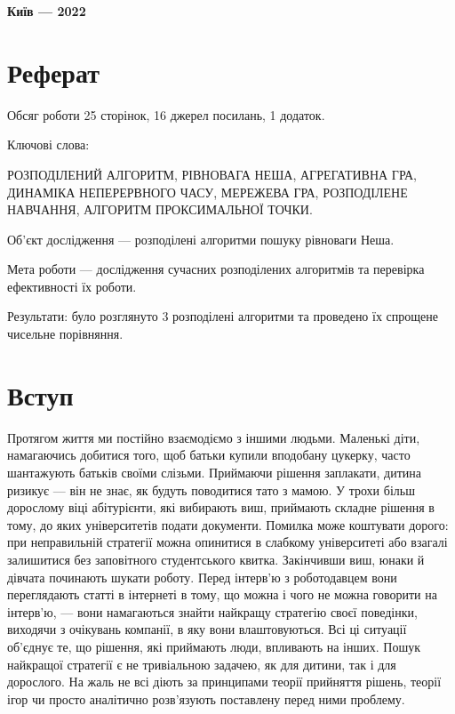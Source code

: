 \documentclass[a4paper]{article}
\begin{document}
\vfill

\centerline{\textbf{Київ --- 2022}}
\clearpage


\section*{Реферат}

Обсяг роботи 25 сторінок, 16 джерел посилань, 1 додаток.

Ключові слова:

РОЗПОДІЛЕНИЙ АЛГОРИТМ, РІВНОВАГА НЕША, АГРЕГАТИВНА ГРА, ДИНАМІКА НЕПЕРЕРВНОГО ЧАСУ, МЕРЕЖЕВА ГРА, РОЗПОДІЛЕНЕ НАВЧАННЯ, АЛГОРИТМ ПРОКСИМАЛЬНОЇ ТОЧКИ.

Об’єкт дослідження --- розподілені алгоритми пошуку рівноваги Неша.

Мета роботи --- дослідження сучасних розподілених алгоритмів та перевірка ефективності їх роботи.

Результати: було розглянуто 3
розподілені алгоритми та проведено їх спрощене чисельне порівняння.

\clearpage


\renewcommand\cftsecdotsep{\cftdot}
\cftsetpnumwidth{9pt}
\tableofcontents
\clearpage

\section{Вступ}
Протягом життя ми постійно взаємодіємо з іншими людьми. Маленькі діти, намагаючись добитися того, щоб батьки купили вподобану цукерку, часто шантажують батьків своїми слізьми. Приймаючи рішення заплакати, дитина ризикує — він не знає, як будуть поводитися тато з мамою. У трохи більш дорослому віці абітурієнти, які вибирають виш, приймають складне рішення в тому, до яких університетів подати документи. Помилка може коштувати дорого: при неправильній стратегії можна опинитися в слабкому університеті або взагалі залишитися без заповітного студентського квитка. Закінчивши виш, юнаки й дівчата починають шукати роботу. Перед інтерв'ю з роботодавцем вони переглядають статті в інтернеті в тому, що можна і чого не можна говорити на інтерв'ю, — вони намагаються знайти найкращу стратегію своєї поведінки, виходячи з очікувань компанії, в яку вони влаштовуються. Всі ці ситуації об'єднує те, що рішення, які приймають люди, впливають на інших. Пошук найкращої стратегії є не тривіальною задачею, як для дитини, так і для дорослого. На жаль не всі діють за принципами теорії прийняття рішень, теорії ігор чи просто аналітично розв'язують поставлену перед ними проблему.
\end{document}
